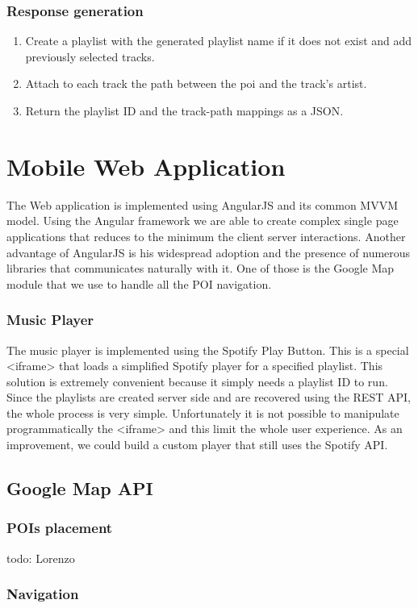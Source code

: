 \documentclass[paper=a4, fontsize=11pt]{scrartcl}
\begin{document}
\subsubsection{Response generation}
\begin{enumerate}
\item Create a playlist with the generated playlist name if it does not exist and add previously selected tracks.
\item Attach to each track the path between the poi and the track's artist.
\item Return the playlist ID and the track-path mappings as a JSON.
\end{enumerate}


\section{Mobile Web Application}
The Web application is implemented using AngularJS and its common MVVM model. Using the Angular framework we are able to create complex single page applications that reduces to the minimum the client server interactions. Another advantage of AngularJS is his widespread adoption and the presence of numerous libraries that communicates naturally with it. One of those is the Google Map module that we use to handle all the POI navigation.
\subsubsection{Music Player}
The music player is implemented using the Spotify Play Button. This is a special <iframe> that loads a simplified Spotify player for a specified playlist. This solution is extremely convenient because it simply needs a playlist ID to run. Since the playlists are created server side and are recovered using the REST API, the whole process is very simple.
Unfortunately it is not possible to manipulate programmatically the <iframe> and this limit the whole user experience. As an improvement, we could build a custom player that still uses the Spotify API.
\subsection{Google Map API}
\subsubsection{POIs placement}
todo: Lorenzo
\subsubsection{Navigation}
\end{document}
